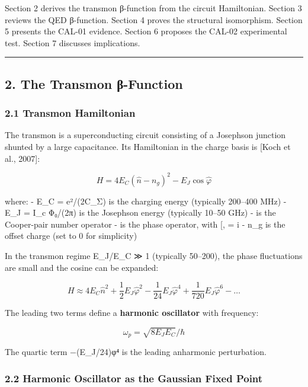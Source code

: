 \documentclass[
]{article}
\begin{document}
Section 2 derives the transmon β-function from the circuit Hamiltonian.
Section 3 reviews the QED β-function. Section 4 proves the structural
isomorphism. Section 5 presents the CAL-01 evidence. Section 6 proposes
the CAL-02 experimental test. Section 7 discusses implications.

\begin{center}\rule{0.5\linewidth}{0.5pt}\end{center}

\subsection{2. The Transmon
β-Function}\label{the-transmon-ux3b2-function}

\subsubsection{2.1 Transmon Hamiltonian}\label{transmon-hamiltonian}

The transmon is a superconducting circuit consisting of a Josephson
junction shunted by a large capacitance. Its Hamiltonian in the charge
basis is {[}Koch et al., 2007{]}:

\[H = 4E_C(\hat{n} - n_g)^2 - E_J\cos\hat{\varphi}\]

where: - E\_C = e²/(2C\_Σ) is the charging energy (typically 200--400
MHz) - E\_J = I\_c Φ₀/(2π) is the Josephson energy (typically 10--50
GHz) -  is the Cooper-pair number operator -  is the phase
operator, with {[}, \hat{n}{]} = i - n\_g is the offset charge
(set to 0 for simplicity)

In the transmon regime E\_J/E\_C ≫ 1 (typically 50--200), the phase
fluctuations are small and the cosine can be expanded:

\[H \approx 4E_C\hat{n}^2 + \frac{1}{2}E_J\hat{\varphi}^2 - \frac{1}{24}E_J\hat{\varphi}^4 + \frac{1}{720}E_J\hat{\varphi}^6 - \ldots\]

The leading two terms define a \textbf{harmonic oscillator} with
frequency:

\[\omega_p = \sqrt{8E_JE_C}/\hbar\]

The quartic term −(E\_J/24)φ⁴ is the leading anharmonic perturbation.

\subsubsection{2.2 Harmonic Oscillator as the Gaussian Fixed
Point}\label{harmonic-oscillator-as-the-gaussian-fixed-point}
\end{document}
